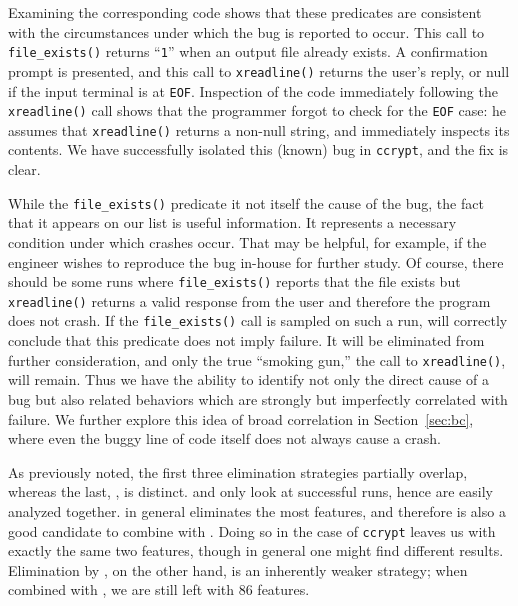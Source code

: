 Examining the corresponding code shows that these predicates are
consistent with the circumstances under which the bug is reported to
occur.  This call to \texttt{file\_exists()} returns ``{\tt 1}'' when an output
file already exists.  A confirmation prompt is presented, and this
call to \texttt{xreadline()} returns the user's reply, or null if the
input terminal is at \texttt{EOF}.  Inspection of the code immediately
following the \texttt{xreadline()} call shows that the programmer
forgot to check for the \texttt{EOF} case: he assumes that
\texttt{xreadline()} returns a non-null string, and immediately
inspects its contents.  We have successfully isolated this (known) bug
in \texttt{ccrypt}, and the fix is clear.

While the \texttt{file\_exists()} predicate it not itself the cause of
the bug, the fact that it appears on our list is useful information.
It represents a necessary condition under which crashes occur.  That
may be helpful, for example, if the engineer wishes to reproduce the
bug in-house for further study.  Of course, there should be some runs
where \texttt{file\_exists()} reports that the file exists but
\texttt{xreadline()} returns a valid response from the user and
therefore the program does not crash.  If the \texttt{file\_exists()}
call is sampled on such a run,  will correctly conclude that this predicate does not
imply failure.  It will be eliminated from further consideration, and
only the true ``smoking gun,'' the call to \texttt{xreadline()}, will
remain.  Thus we have the ability to identify not only the direct
cause of a bug but also related behaviors which are strongly but
imperfectly correlated with failure.  We further explore this idea of
broad correlation in Section~\ref{sec:bc}, where even the buggy line
of code itself does not always cause a crash.

As previously noted, the first three elimination strategies partially
overlap, whereas the last, , is
distinct.   and  only look at successful runs, hence are easily
analyzed together.   in general
eliminates the most features, and therefore is also a good candidate
to combine with .  Doing so in the
case of \texttt{ccrypt} leaves us with exactly the same two features,
though in general one might find different results.  Elimination by
, on the other hand, is an inherently
weaker strategy; when combined with ,
we are still left with 86 features.

